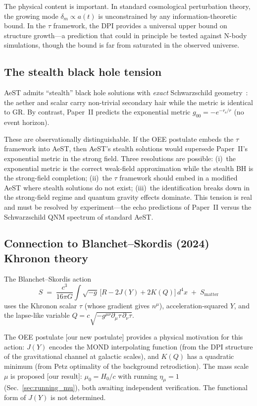 \documentclass[prd,twocolumn,superscriptaddress,longbibliography,floatfix]{revtex4-2}
\newcommand{\tauasym}{\tau}
\newcommand{\rs}{r_{\mathrm{s}}}
\begin{document}
The physical content is important.  In standard
cosmological perturbation theory, the growing mode
$\delta_m \propto a(t)$ is unconstrained by any
information-theoretic bound.  In the $\tauasym$ framework,
the DPI provides a universal upper bound on
structure growth---a prediction that could in principle
be tested against N-body simulations, though the bound is
far from saturated in the observed universe.

\subsection{The stealth black hole tension}

AeST admits ``stealth'' black hole solutions with
\emph{exact} Schwarzschild
geometry~\cite{SkordisVokrouhlicky2024}: the aether and
scalar carry non-trivial secondary hair while the metric
is identical to GR.  By contrast, Paper~II predicts the
exponential metric $g_{00} = -e^{-\rs/r}$ (no event
horizon).

These are observationally distinguishable.
If the OEE postulate embeds the $\tauasym$ framework
into AeST, then AeST's stealth solutions would supersede
Paper~II's exponential metric in the strong field.  Three
resolutions are possible:
(i)~the exponential metric is the correct weak-field
approximation while the stealth BH is the strong-field
completion;
(ii)~the $\tauasym$ framework should embed in a modified
AeST where stealth solutions do not exist;
(iii)~the identification breaks down in the strong-field
regime and quantum gravity effects dominate.
This tension is real and must be resolved by
experiment---the echo predictions of Paper~II versus the
Schwarzschild QNM spectrum of standard AeST.

\subsection{Connection to Blanchet--Skordis (2024) Khronon theory}

The Blanchet--Skordis
action~\cite{BlanchetSkordis2024,BlanchetSkordis2025}
\begin{equation}
S \;=\; \frac{c^3}{16\pi G}\int\!\sqrt{-g}\,
\bigl[R - 2J(Y) + 2K(Q)\bigr]\,d^4x
\;+\; S_{\mathrm{matter}}
\label{eq:BS_action}
\end{equation}
uses the Khronon scalar $\tau$ (whose gradient gives
$n^\mu$), acceleration-squared $Y$, and the lapse-like
variable $Q = c\sqrt{-g^{\mu\nu}\partial_\mu\tau\,
\partial_\nu\tau}$.

The OEE postulate [our new postulate] provides a
physical motivation for this action: $J(Y)$ encodes
the MOND interpolating function (from the DPI structure
of the gravitational channel at galactic scales), and
$K(Q)$ has a quadratic minimum (from Petz optimality
of the background retrodiction).  The mass scale $\mu$
is proposed [our result]: $\mu_0 = H_0/c$ with running
$\eta_\mu = 1$ (Sec.~\ref{sec:running_mu}), both
awaiting independent verification.  The functional
form of $J(Y)$ is not determined.
\end{document}
